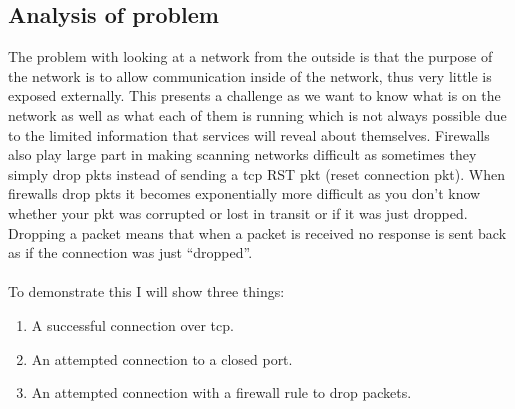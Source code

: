 \documentclass[titlepage]{article}
\let\Oldsubsection\subsection{}
\renewcommand{\subsection}{\FloatBarrier\Oldsubsection}
\begin{document}
\lstset{language=HTML}


\subsection{Analysis of problem}

The problem with looking at a network from the outside is that the purpose of the network is to 
allow communication inside of the network, thus very little is exposed externally. This presents a 
challenge as we want to know what is on the network as well as what each of them is running which is 
not always possible due to the limited information that \glspl{service} will reveal about 
themselves. Firewalls also play large part in making scanning networks difficult as sometimes they 
simply drop \glspl{pkt} instead of sending a \gls{tcp} RST \gls{pkt} (reset connection \gls{pkt}). 
When firewalls drop \glspl{pkt} it becomes exponentially more difficult as you don't know whether 
your \gls{pkt} was corrupted or lost in transit or if it was just dropped.
Dropping a packet means that when a packet is received no response is sent back
as if the connection was just ``dropped''. \\\\ To demonstrate this 
I will show three things:

\begin{enumerate}
  \item{A successful connection over \gls{tcp}.}
  \item{An attempted connection to a closed port.}
  \item{An attempted connection with a firewall rule to drop packets.}
\end{enumerate}
\end{document}

